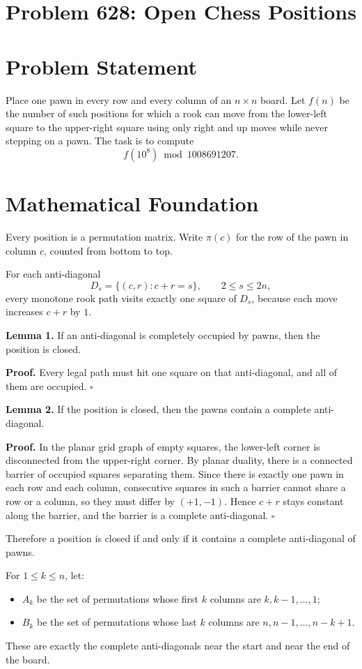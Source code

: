 \documentclass[11pt]{article}
\begin{document}
\section*{Problem 628: Open Chess Positions}

\section{Problem Statement}

Place one pawn in every row and every column of an $n \times n$ board. Let $f(n)$ be the number of such positions for which a rook can move from the lower-left square to the upper-right square using only right and up moves while never stepping on a pawn. The task is to compute
\[
f(10^8) \bmod 1008691207.
\]

\section{Mathematical Foundation}

Every position is a permutation matrix. Write $\pi(c)$ for the row of the pawn in column $c$, counted from bottom to top.

For each anti-diagonal
\[
D_s = \{(c,r) : c+r=s\},
\qquad 2 \le s \le 2n,
\]
every monotone rook path visits exactly one square of $D_s$, because each move increases $c+r$ by $1$.

\textbf{Lemma 1.} If an anti-diagonal is completely occupied by pawns, then the position is closed.

\textbf{Proof.} Every legal path must hit one square on that anti-diagonal, and all of them are occupied. $\square$

\textbf{Lemma 2.} If the position is closed, then the pawns contain a complete anti-diagonal.

\textbf{Proof.} In the planar grid graph of empty squares, the lower-left corner is disconnected from the upper-right corner. By planar duality, there is a connected barrier of occupied squares separating them. Since there is exactly one pawn in each row and each column, consecutive squares in such a barrier cannot share a row or a column, so they must differ by $(+1,-1)$. Hence $c+r$ stays constant along the barrier, and the barrier is a complete anti-diagonal. $\square$

Therefore a position is closed if and only if it contains a complete anti-diagonal of pawns.

For $1 \le k \le n$, let:
\begin{itemize}
\item $A_k$ be the set of permutations whose first $k$ columns are $k,k-1,\dots,1$;
\item $B_k$ be the set of permutations whose last $k$ columns are $n,n-1,\dots,n-k+1$.
\end{itemize}
These are exactly the complete anti-diagonals near the start and near the end of the board.
\end{document}
